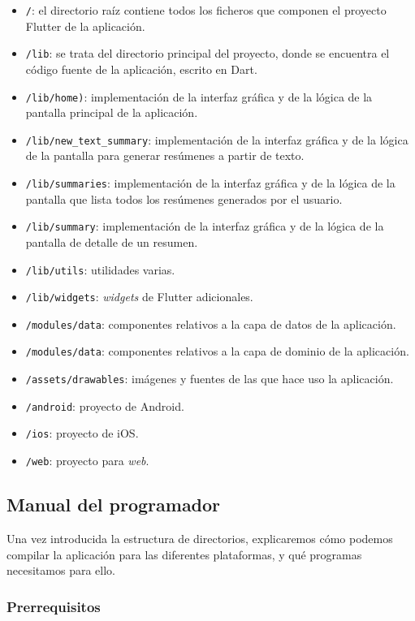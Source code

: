 \vspace{-0.2cm}
\begin{itemize} [\textbullet]
	\tightlist
	\item \texttt{/}: el directorio raíz contiene todos los ficheros que componen el proyecto Flutter de la aplicación.
	\item \texttt{/lib}: se trata del directorio principal del proyecto, donde se encuentra el código fuente de la aplicación, escrito en Dart.
	\item \texttt{/lib/home)}: implementación de la interfaz gráfica y de la lógica de la pantalla principal de la aplicación.
	\item \texttt{/lib/new\_text\_summary}: implementación de la interfaz gráfica y de la lógica de la pantalla para generar resúmenes a partir de texto.
	\item \texttt{/lib/summaries}: implementación de la interfaz gráfica y de la lógica de la pantalla que lista todos los resúmenes generados por el usuario.
	\item \texttt{/lib/summary}: implementación de la interfaz gráfica y de la lógica  de la pantalla de detalle de un resumen.
	\item \texttt{/lib/utils}: utilidades varias.
	\item \texttt{/lib/widgets}: \emph{widgets} de Flutter adicionales.
	\item \texttt{/modules/data}: componentes relativos a la capa de datos de la aplicación.
	\item \texttt{/modules/data}: componentes relativos a la capa de dominio de la aplicación.
	\item \texttt{/assets/drawables}: imágenes y fuentes de las que hace uso la aplicación.
	\item \texttt{/android}: proyecto de Android.
	\item \texttt{/ios}: proyecto de iOS.
	\item \texttt{/web}: proyecto para \emph{web}.
\end{itemize}


\subsection{Manual del programador}

Una vez introducida la estructura de directorios, explicaremos cómo podemos compilar la aplicación para las diferentes plataformas, y qué programas necesitamos para ello.

\subsubsection{Prerrequisitos}

